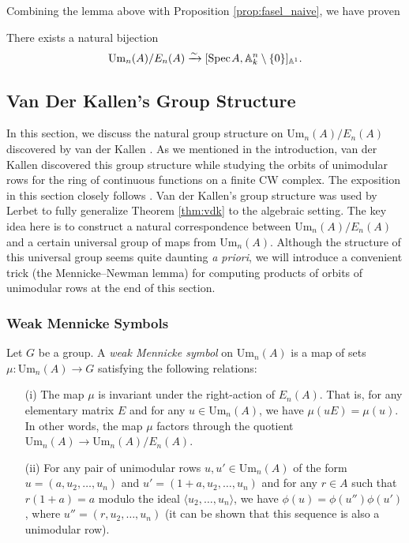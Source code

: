 Combining the lemma above with Proposition \ref{prop:fasel_naive}, we have proven

\begin{corollary}
    There exists a natural bijection \[\mathrm{Um}_n(A)/E_n(A) \xrightarrow{\sim} [\text{Spec}\hspace{0.1em} A, \mathbb{A}^n_k\setminus \{0\}]_{\mathbb{A}^1}.\] 
\end{corollary}

\subsection{Van Der Kallen's Group Structure}\label{sec:group_structure}

In this section, we discuss the natural group structure on $\mathrm{Um}_n(A)/E_n(A)$ discovered by van der Kallen \cite{vdk}. As we mentioned in the introduction, van der Kallen discovered this group structure while studying the orbits of unimodular rows for the ring of continuous functions on a finite CW complex. The exposition in this section closely follows \cite[Section 3]{Lerbet}. Van der Kallen's group structure was used by Lerbet to fully generalize Theorem \ref{thm:vdk} to the algebraic setting. The key idea here is to construct a natural correspondence between $\mathrm{Um}_n(A)/E_n(A)$ and a certain universal group of maps from $\mathrm{Um}_n(A)$. Although the structure of this universal group seems quite daunting \textit{a priori}, we will introduce a convenient trick (the Mennicke--Newman lemma) for computing products of orbits of unimodular rows at the end of this section.

\subsubsection{Weak Mennicke Symbols}

\begin{definition}\label{def:wms}
    Let $G$ be a group. A \textit{weak Mennicke symbol} on $\mathrm{Um}_n(A)$ is a map of sets $\mu\colon \mathrm{Um}_n(A) \to G$ satisfying the following relations:
    \begin{itemize}
        \item[(i)] The map $\mu$ is invariant under the right-action of $E_n(A)$. That is, for any elementary matrix $E$ and for any $u \in \mathrm{Um}_n(A)$, we have $\mu(uE) = \mu(u)$. In other words, the map $\mu$ factors through the quotient $\mathrm{Um}_n(A) \to \mathrm{Um}_n(A)/E_n(A)$. 
        \item[(ii)] For any pair of unimodular rows $u,u' \in \mathrm{Um}_n(A)$ of the form $u = (a,u_2,\ldots,u_n)$ and $u' = (1+a,u_2,\ldots,u_n)$ and for any $r \in A$ such that $r(1 + a) = a$ modulo the ideal $\langle u_2,\ldots,u_n\rangle$, we have $\phi(u) = \phi(u'')\phi(u')$, where $u'' = (r,u_2,\ldots,u_n)$ (it can be shown that this sequence is also a unimodular row). 
    \end{itemize}
\end{definition}

